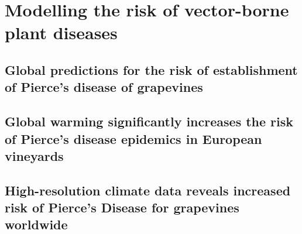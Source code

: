 \documentclass[
	10pt, %
	fleqn, %
	a4paper, %
]{LegrandOrangeBook}
\begin{document}

\part{Modelling the risk of vector-borne plant diseases}
\chapterspaceabove{6.75cm}
\chapterspacebelow{7.25cm}

\chapter{Global predictions for the risk of establishment of Pierce’s disease
  of grapevines}
%

\chapterspaceabove{6.75cm}
\chapterspacebelow{7.25cm}

\chapter{Global warming significantly increases the risk of Pierce's disease
  epidemics in European vineyards}
%

\chapterspaceabove{6.75cm}
\chapterspacebelow{7.25cm}

\chapter{High-resolution climate data reveals increased risk of Pierce's
  Disease for grapevines worldwide}
%
\end{document}

